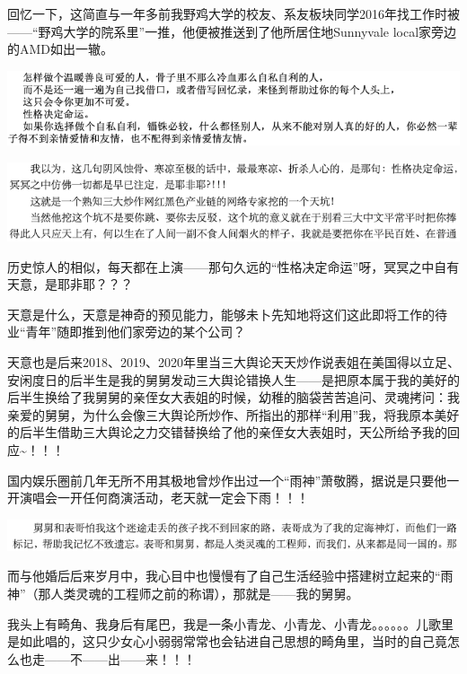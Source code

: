 \documentclass[9pt, b5paper]{article}
\begin{document}
回忆一下，这简直与一年多前我野鸡大学的校友、系友板块同学2016年找工作时被——“野鸡大学的院系里”一推，他便被推送到了他所居住地Sunnyvale local家旁边的AMD如出一辙。

\begin{center}
\includegraphics[width=.9\linewidth]{./pic/backups_plans_20210413_131623.png}
\end{center}

\begin{center}
\includegraphics[width=.9\linewidth]{./pic/backups_plans_20210428_094132.png}
\end{center}

历史惊人的相似，每天都在上演——那句久远的“性格决定命运”呀，冥冥之中自有天意，是耶非耶？？？

天意是什么，天意是神奇的预见能力，能够未卜先知地将这们这此即将工作的待业“青年”随即推到他们家旁边的某个公司？

天意也是后来2018、2019、2020年里当三大舆论天天炒作说表姐在美国得以立足、安闲度日的后半生是我的舅舅发动三大舆论错换人生——是把原本属于我的美好的后半生换给了我舅舅的亲侄女大表姐的时候，幼稚的脑袋苦苦追问、灵魂拷问：我亲爱的舅舅，为什么会像三大舆论所炒作、所指出的那样“利用”我，将我原本美好的后半生借助三大舆论之力交错替换给了他的亲侄女大表姐时，天公所给予我的回应\textasciitilde{}！！！

国内娱乐圈前几年无所不用其极地曾炒作出过一个“雨神”萧敬腾，据说是只要他一开演唱会一开任何商演活动，老天就一定会下雨！！！

\begin{center}
\includegraphics[width=.9\linewidth]{./pic/backups_plans_20210428_095419.png}
\end{center}

而与他婚后后来岁月中，我心目中也慢慢有了自己生活经验中搭建树立起来的“雨神”（那人类灵魂的工程师之前的称谓），那就是——我的舅舅。

我头上有畸角、我身后有尾巴，我是一条小青龙、小青龙、小青龙。。。。。。儿歌里是如此唱的，这只少女心小弱弱常常也会钻进自己思想的畸角里，当时的自己竟怎么也走——不——出——来！！！
\end{document}
